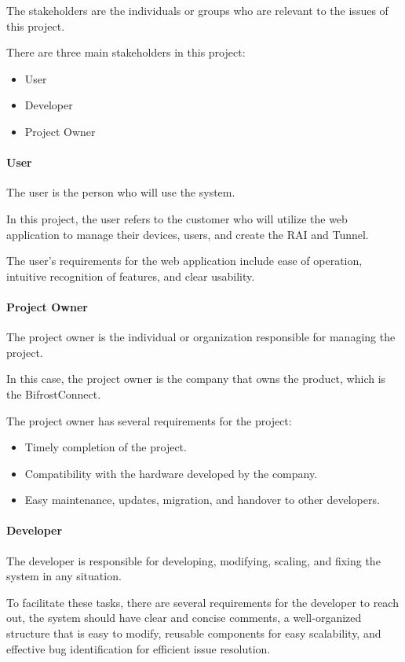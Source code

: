 The stakeholders are the individuals or groups who are relevant to the issues of this project.

There are three main stakeholders in this project:
\begin{itemize}
    \item User
    \item Developer
    \item Project Owner
\end{itemize}

\paragraph{User} 
The user is the person who will use the system. 

In this project, the user refers to the customer who will utilize the web application 
to manage their devices, users, and create the RAI and Tunnel.

The user's requirements for the web application include ease of operation, 
intuitive recognition of features, and clear usability.

\paragraph{Project Owner}
The project owner is the individual or organization responsible for managing the project. 

In this case, the project owner is the company that owns the product, which is the BifrostConnect.

The project owner has several requirements for the project:
\begin{itemize}
    \item Timely completion of the project.
    \item Compatibility with the hardware developed by the company.
    \item Easy maintenance, updates, migration, and handover to other developers.
\end{itemize}

\paragraph{Developer}
The developer is responsible for developing, modifying, scaling, and fixing the system 
in any situation.

To facilitate these tasks, there are several requirements for the developer to reach out,
the system should have clear and concise comments, a well-organized structure 
that is easy to modify, reusable components for easy scalability, and effective bug 
identification for efficient issue resolution.
